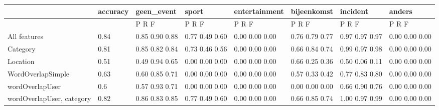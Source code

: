 \documentclass[
10pt, %
a4paper, %
oneside, %
headinclude,footinclude, %
BCOR5mm, %
]{scrartcl}
\begin{document}
\begin{landscape}
\begin{table}[h]
\begin{tabular}{|l|l|l|l|l|l|l|l|}
\hline
                          & accuracy & geen\_event    & sport          & entertainment  & bijeenkomst    & incident       & anders         \\ \hline
                          &          & P    R    F    & P    R    F    & P    R    F    & P    R    F    & P    R    F    & P    R    F    \\ \hline
All features              & 0.84     & 0.85 0.90 0.88 & 0.77 0.49 0.60 & 0.00 0.00 0.00 & 0.76 0.79 0.77 & 0.97 0.97 0.97 & 0.00 0.00 0.00 \\ \hline
Category                  & 0.81     & 0.85 0.82 0.84 & 0.73 0.46 0.56 & 0.00 0.00 0.00 & 0.66 0.84 0.74 & 0.99 0.97 0.98 & 0.00 0.00 0.00 \\ \hline
Location                  & 0.51     & 0.49 0.94 0.65 & 0.00 0.00 0.00 & 0.00 0.00 0.00 & 0.66 0.25 0.36 & 0.50 0.06 0.11 & 0.00 0.00 0.00 \\ \hline
WordOverlapSimple         & 0.63     & 0.60 0.85 0.71 & 0.00 0.00 0.00 & 0.00 0.00 0.00 & 0.57 0.33 0.42 & 0.77 0.83 0.80 & 0.00 0.00 0.00 \\ \hline
wordOverlapUser           & 0.6      & 0.57 0.93 0.71 & 0.00 0.00 0.00 & 0.00 0.00 0.00 & 0.00 0.00 0.00 & 0.66 0.90 0.76 & 0.00 0.00 0.00 \\ \hline
wordOverlapUser, category & 0.82     & 0.86 0.83 0.85 & 0.77 0.49 0.60 & 0.00 0.00 0.00 & 0.66 0.85 0.74 & 1.00 0.97 0.99 & 0.00 0.00 0.00 \\ \hline
\end{tabular}
\end{table}
\end{landscape}




\end{document}

